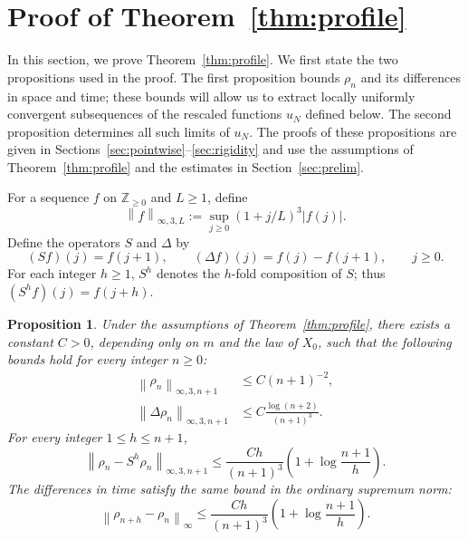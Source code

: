 \documentclass[11pt,letterpaper,reqno]{amsart}
\numberwithin{equation}{section}
\theoremstyle{plain}
\newtheorem{proposition}[theorem]{Proposition}
\theoremstyle{remark}
\newcommand{\Zp}{\mathbb Z_{\ge0}}
\newcommand{\norm}[1]{\left\lVert#1\right\rVert}
\begin{document}
\section{Proof of Theorem~\ref{thm:profile}}\label{sec:mainproof}
In this section, we prove Theorem~\ref{thm:profile}.
We first state the two propositions used in the proof. The first proposition bounds $\rho_n$ and its differences in space and time; these bounds will allow us to extract locally uniformly convergent subsequences of the rescaled functions $u_N$ defined below. The second proposition determines all such limits of $u_N$. The proofs of these propositions are given in Sections~\ref{sec:pointwise}--\ref{sec:rigidity} and use the assumptions of Theorem~\ref{thm:profile} and the estimates in Section~\ref{sec:prelim}.

For a sequence $f$ on $\Zp$ and $L\ge1$, define
\[
 \norm{f}_{\infty,3,L}
 :=\sup_{j\ge0}(1+j/L)^3|f(j)|.
\]
Define the operators $S$ and $\Delta$ by
\[
 (Sf)(j)=f(j+1),\qquad
 (\Delta f)(j)=f(j)-f(j+1),\qquad j\ge0.
\]
For each integer $h\ge 1$, $S^h$ denotes the $h$-fold
composition of $S$; thus
$(S^h f)(j)=f(j+h)$.

\begin{proposition}\label{prop:smoothing}
Under the assumptions of Theorem~\ref{thm:profile}, there exists a constant $C>0$, depending only on $m$ and the law of $X_0$, such that the following bounds hold for every integer $n\ge0$:
\begin{align}
 \norm{\rho_n}_{\infty,3,n+1}&\le C(n+1)^{-2},\label{eq:sup}\\
 \norm{\Delta\rho_n}_{\infty,3,n+1}&\le C\frac{\log(n+2)}{(n+1)^3}.\label{eq:gradient}
\end{align}
For every integer $1\le h\le n+1$,
\begin{equation}\label{eq:spmod}
 \norm{\rho_n-S^h\rho_n}_{\infty,3,n+1}
 \le \frac{Ch}{(n+1)^3}\left(1+\log\frac{n+1}{h}\right).
\end{equation}
The differences in time satisfy the same bound in the ordinary supremum norm:
\begin{equation}\label{eq:timemod}
 \norm{\rho_{n+h}-\rho_n}_{\infty}
 \le \frac{Ch}{(n+1)^3}\left(1+\log\frac{n+1}{h}\right).
\end{equation}
\end{proposition}
\end{document}
